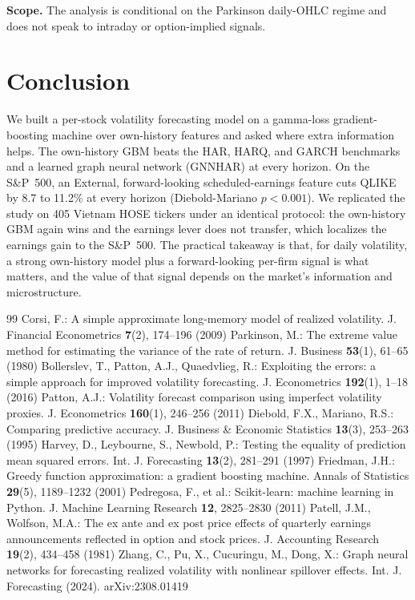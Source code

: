 \documentclass{llncs}
\begin{document}
\noindent\textbf{Scope.} The analysis is conditional on the Parkinson daily-OHLC regime and does not
speak to intraday or option-implied signals.

\section{Conclusion}
We built a per-stock volatility forecasting model on a gamma-loss gradient-boosting machine over
own-history features and asked where extra information helps. The own-history GBM beats the HAR, HARQ,
and GARCH benchmarks and a learned graph neural network (GNNHAR) at every horizon. On the S\&P~500, an
External, forward-looking scheduled-earnings feature cuts QLIKE by 8.7 to 11.2\% at every horizon
(Diebold-Mariano $p<0.001$). We replicated the study on 405 Vietnam HOSE tickers under an identical
protocol: the own-history GBM again wins and the earnings lever does not transfer, which localizes the
earnings gain to the S\&P~500. The practical takeaway is that, for daily volatility, a strong
own-history model plus a forward-looking per-firm signal is what matters, and the value of that signal
depends on the market's information and microstructure.

\begin{thebibliography}{99}
 Corsi, F.: A simple approximate long-memory model of realized volatility. J. Financial Econometrics \textbf{7}(2), 174--196 (2009)
 Parkinson, M.: The extreme value method for estimating the variance of the rate of return. J. Business \textbf{53}(1), 61--65 (1980)
 Bollerslev, T., Patton, A.J., Quaedvlieg, R.: Exploiting the errors: a simple approach for improved volatility forecasting. J. Econometrics \textbf{192}(1), 1--18 (2016)
 Patton, A.J.: Volatility forecast comparison using imperfect volatility proxies. J. Econometrics \textbf{160}(1), 246--256 (2011)
 Diebold, F.X., Mariano, R.S.: Comparing predictive accuracy. J. Business \& Economic Statistics \textbf{13}(3), 253--263 (1995)
 Harvey, D., Leybourne, S., Newbold, P.: Testing the equality of prediction mean squared errors. Int. J. Forecasting \textbf{13}(2), 281--291 (1997)
 Friedman, J.H.: Greedy function approximation: a gradient boosting machine. Annals of Statistics \textbf{29}(5), 1189--1232 (2001)
 Pedregosa, F., et al.: Scikit-learn: machine learning in Python. J. Machine Learning Research \textbf{12}, 2825--2830 (2011)
 Patell, J.M., Wolfson, M.A.: The ex ante and ex post price effects of quarterly earnings announcements reflected in option and stock prices. J. Accounting Research \textbf{19}(2), 434--458 (1981)
 Zhang, C., Pu, X., Cucuringu, M., Dong, X.: Graph neural networks for forecasting realized volatility with nonlinear spillover effects. Int. J. Forecasting (2024). arXiv:2308.01419
\end{thebibliography}
\end{document}
